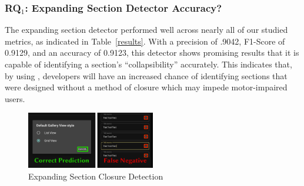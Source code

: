\subsubsection{RQ$_1$: Expanding Section Detector Accuracy?}

The expanding section detector performed well across nearly all of our studied metrics, as indicated in Table~\ref{results}. With a precision of .9042, F1-Score of 0.9129, and an accuracy of 0.9123, this detector shows promising results that it is capable of identifying a section's ``collapsibility'' accurately. This indicates that, by using \MotorEase, developers will have an increased chance of identifying sections that were designed without a method of closure which may impede motor-impaired users. 

\begin{figure}[h]
    \centering
    \includegraphics[width=0.5\textwidth]{imgs/expandingResultsV2.jpg}
    \caption{Expanding Section Closure Detection}
    \label{expandingResults}
\end{figure}

